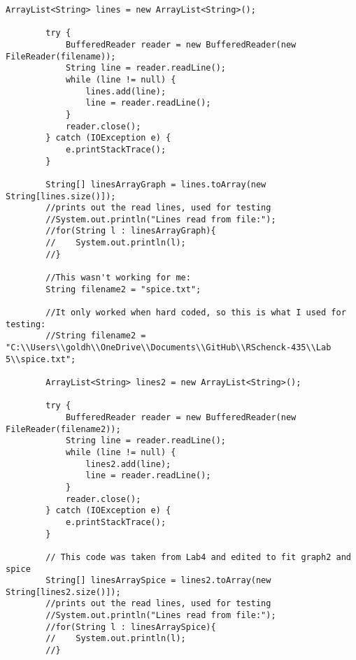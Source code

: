 \documentclass[10pt]{article}
\begin{document}
\begin{lstlisting}[frame=single, ]
        ArrayList<String> lines = new ArrayList<String>();

        try {
            BufferedReader reader = new BufferedReader(new FileReader(filename));
            String line = reader.readLine();
            while (line != null) {
                lines.add(line);
                line = reader.readLine();
            }
            reader.close();
        } catch (IOException e) {
            e.printStackTrace();
        }

        String[] linesArrayGraph = lines.toArray(new String[lines.size()]);
        //prints out the read lines, used for testing
        //System.out.println("Lines read from file:");
        //for(String l : linesArrayGraph){
        //    System.out.println(l);
        //}

        //This wasn't working for me: 
        String filename2 = "spice.txt";

        //It only worked when hard coded, so this is what I used for testing:
        //String filename2 = "C:\\Users\\goldh\\OneDrive\\Documents\\GitHub\\RSchenck-435\\Lab 5\\spice.txt";

        ArrayList<String> lines2 = new ArrayList<String>();

        try {
            BufferedReader reader = new BufferedReader(new FileReader(filename2));
            String line = reader.readLine();
            while (line != null) {
                lines2.add(line);
                line = reader.readLine();
            }
            reader.close();
        } catch (IOException e) {
            e.printStackTrace();
        }

        // This code was taken from Lab4 and edited to fit graph2 and spice
        String[] linesArraySpice = lines2.toArray(new String[lines2.size()]);
        //prints out the read lines, used for testing
        //System.out.println("Lines read from file:");
        //for(String l : linesArraySpice){
        //    System.out.println(l);
        //}


\end{lstlisting}
\end{document}

